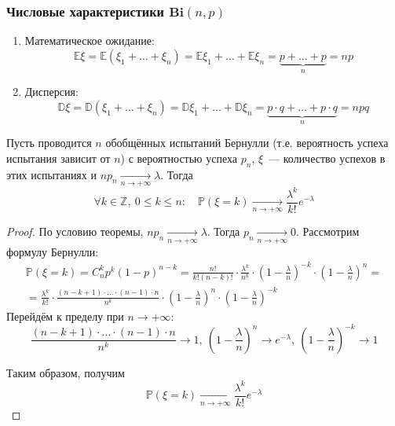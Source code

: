 \subsubsection{Числовые характеристики $\mathbf{Bi}(n, p)$}
\begin{enumerate}
    \item Математическое ожидание:
    \begin{equation*}
        \mathbb{E}\xi = \mathbb{E}(\xi_1 + \ldots + \xi_n) = \mathbb{E}\xi_1 + \ldots + \mathbb{E}\xi_n = \underbrace{p + \ldots + p}_{n} = np
    \end{equation*}
    \item Дисперсия:
    \begin{equation*}
        \mathbb{D}\xi = \mathbb{D}(\xi_1 + \ldots + \xi_n) = \mathbb{D}\xi_1 + \ldots + \mathbb{D}\xi_n = \underbrace{p \cdot q + \ldots + p \cdot q}_{n} = npq
    \end{equation*}
\end{enumerate}

\begin{namedthm}
    Пусть проводится $n$ обобщённых испытаний Бернулли (т.е. вероятность успеха испытания зависит от $n$) с вероятностью успеха $p_n$, $\xi$~--- количество успехов в этих испытаниях и $n p_{n} \underset{n \to +\infty}{\longrightarrow} \lambda$. Тогда
    \begin{equation*}
        \forall k \in \mathbb{Z},~ 0 \leqslant k \leqslant n: \quad \mathbb{P}\left(\xi=k\right) \underset{n \to +\infty}{\longrightarrow} \frac{\lambda^{k}}{k !} e^{-\lambda}
    \end{equation*}
\end{namedthm}

\begin{proof}
    По условию теоремы, $n p_n \xrightarrow[n \to +\infty]{} \lambda$. Тогда $p_n \xrightarrow[n \to +\infty]{} 0$. Рассмотрим формулу Бернулли:
    \begin{multline*}
        \mathbb{P}(\xi = k) = C_n^k p^k (1 - p)^{n-k} = \frac{n!}{k!(n - k)!} \cdot \frac{\lambda^k}{n^k} \cdot \left(1 - \frac{\lambda}{n}\right)^{-k} \cdot \left(1 - \frac{\lambda}{n}\right)^n = \\
        = \frac{\lambda^k}{k!} \cdot \frac{(n - k + 1) \cdot \ldots \cdot (n - 1) \cdot n}{n^k} \cdot \left(1 - \frac{\lambda}{n}\right)^n \cdot \left(1 - \frac{\lambda}{n}\right)^{-k}
    \end{multline*}
    Перейдём к пределу при $n \to +\infty$:
    \begin{equation*}
        \frac{(n - k + 1) \cdot \ldots \cdot (n - 1) \cdot n}{n^k} \to 1,~ \left(1 - \frac{\lambda}{n}\right)^n \to e^{-\lambda},~ \left(1 - \frac{\lambda}{n}\right)^{-k} \to 1
    \end{equation*}
    
    Таким образом, получим
    \begin{equation*}
        \mathbb{P}(\xi = k) \xrightarrow[n \to +\infty]{} \frac{\lambda^k}{k!} e^{-\lambda}
    \end{equation*}
\end{proof}


